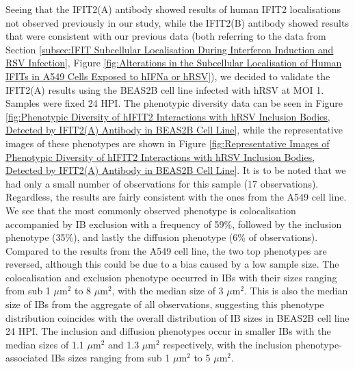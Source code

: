 Seeing that the IFIT2(A) antibody showed results of human IFIT2 localisations not observed previously in our study, while the IFIT2(B) antibody showed results that were consistent with our previous data (both referring to the data from Section \ref{subsec:IFIT Subcellular Localisation During Interferon Induction and RSV Infection}, Figure \ref{fig:Alterations in the Subcellular Localisation of Human IFITs in A549 Cells Exposed to hIFNa or hRSV}), we decided to validate the IFIT2(A) results using the BEAS2B cell line infected with hRSV at MOI 1. Samples were fixed 24 HPI. The phenotypic diversity data can be seen in Figure \ref{fig:Phenotypic Diversity of hIFIT2 Interactions with hRSV Inclusion Bodies, Detected by IFIT2(A) Antibody in BEAS2B Cell Line}, while the representative images of these phenotypes are shown in Figure \ref{fig:Representative Images of Phenotypic Diversity of hIFIT2 Interactions with hRSV Inclusion Bodies, Detected by IFIT2(A) Antibody in BEAS2B Cell Line}. It is to be noted that we had only a small number of observations for this sample (17 observations). Regardless, the results are fairly consistent with the ones from the A549 cell line. We see that the most commonly observed phenotype is colocalisation accompanied by IB exclusion with a frequency of 59\%, followed by the inclusion phenotype (35\%), and lastly the diffusion phenotype (6\% of observations). Compared to the results from the A549 cell line, the two top phenotypes are reversed, although this could be due to a bias caused by a low sample size. The colocalisation and exclusion phenotype occurred in IBs with their sizes ranging from sub 1 \(\mu \mbox{m}^2\) to 8 \(\mu \mbox{m}^2\), with the median size of 3 \(\mu \mbox{m}^2\). This is also the median size of IBs from the aggregate of all observations, suggesting this phenotype distribution coincides with the overall distribution of IB sizes in BEAS2B cell line 24 HPI. The inclusion and diffusion phenotypes occur in smaller IBs with the median sizes of 1.1 \(\mu \mbox{m}^2\) and 1.3 \(\mu \mbox{m}^2\) respectively, with the inclusion phenotype-associated IBs sizes ranging from sub 1 \(\mu \mbox{m}^2\) to 5 \(\mu \mbox{m}^2\).

